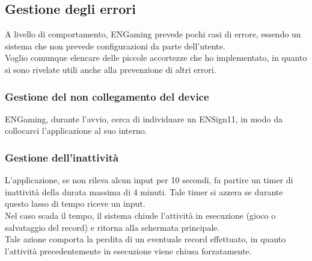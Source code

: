 \subsection{Gestione degli errori}
A livello di comportamento, ENGaming prevede pochi casi di errore, essendo un sistema che non prevede configurazioni da parte dell'utente.\\
Voglio comunque elencare delle piccole accortezze che ho implementato, in quanto si sono rivelate utili anche alla prevenzione di altri errori.
\subsubsection{Gestione del non collegamento del device}
ENGaming, durante l'avvio, cerca di individuare un ENSign11, in modo da collocarci l'applicazione al suo interno.
\subsubsection{Gestione dell'inattività}
\label{sec:inactivity}
L'applicazione, se non rileva alcun input per 10 secondi, fa partire un timer di inattività della durata massima di 4 minuti. Tale timer si azzera se durante questo lasso di tempo riceve un input.\\
Nel caso scada il tempo, il sistema chiude l'attività in esecuzione (gioco o salvataggio del record) e ritorna alla schermata principale.\\
Tale azione comporta la perdita di un eventuale record effettuato, in quanto l'attività precedentemente in esecuzione viene chiusa forzatamente.